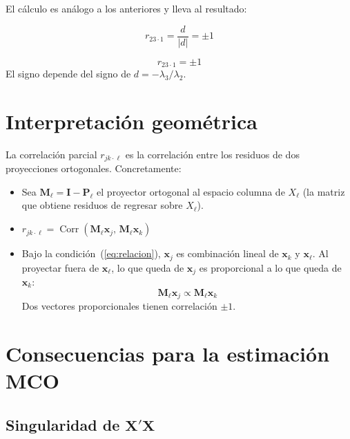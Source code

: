 \documentclass[12pt, letterpaper]{article}
\theoremstyle{remark}
\newcommand{\Corr}{\operatorname{Corr}}
\newcommand{\rp}[2]{r_{#1 \cdot #2}}   %
\begin{document}
El cálculo es análogo a los anteriores y lleva al resultado:

\begin{equation}
  \rp{23}{1}
    = \frac{d}{|d|}
    = \pm 1
  \label{eq:r23_1_resultado}
\end{equation}

\begin{clave}
  \[\rp{23}{1} = \pm 1\]
  El signo depende del signo de $d = -\lambda_3/\lambda_2$.
\end{clave}

\section{Interpretación geométrica}

La correlación parcial $\rp{jk}{\ell}$ es la correlación entre los residuos de
dos proyecciones ortogonales. Concretamente:

\begin{itemize}[leftmargin=1.6em, itemsep=4pt]
  \item Sea $\mathbf{M}_\ell = \mathbf{I} - \mathbf{P}_\ell$ el proyector ortogonal
    al espacio columna de $X_\ell$ (la matriz que obtiene residuos de regresar
    sobre $X_\ell$).

  \item $\rp{jk}{\ell} = \Corr(\mathbf{M}_\ell \mathbf{x}_j,\, \mathbf{M}_\ell \mathbf{x}_k)$

  \item Bajo la condición~(\ref{eq:relacion}), $\mathbf{x}_j$ es combinación
    lineal de $\mathbf{x}_k$ y $\mathbf{x}_\ell$. Al proyectar fuera de $\mathbf{x}_\ell$,
    lo que queda de $\mathbf{x}_j$ es proporcional a lo que queda de $\mathbf{x}_k$:
    \[
      \mathbf{M}_\ell \mathbf{x}_j \propto \mathbf{M}_\ell \mathbf{x}_k
    \]
    Dos vectores proporcionales tienen correlación $\pm 1$.
\end{itemize}

\section{Consecuencias para la estimación MCO}

\subsection{Singularidad de \texorpdfstring{$\mathbf{X'X}$}{X'X}}
\end{document}
